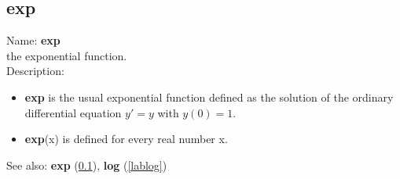 \subsection{exp}
\label{labexp}
\noindent Name: \textbf{exp}\\
the exponential function.\\
\noindent Description: \begin{itemize}

\item \textbf{exp} is the usual exponential function defined as the solution of the
   ordinary differential equation $y'=y$ with $y(0)=1$.

\item \textbf{exp}(x) is defined for every real number x.
\end{itemize}
See also: \textbf{exp} (\ref{labexp}), \textbf{log} (\ref{lablog})
